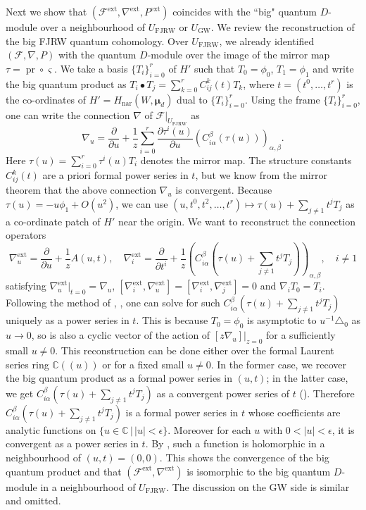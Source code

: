 \documentclass[11pt]{amsart}
\theoremstyle{definition} %
\theoremstyle{remark} %
\newcommand{\CC}{\mathbb C}
\newcommand{\nar}{\operatorname{nar}}
\def\GW{\operatorname{\text{GW}}}
\def\parfrac#1#2{\frac{\partial #1}{\partial #2}}
\newcommand{\bmu}{\boldsymbol{\mu}}
\newcommand{\cF}{\mathcal{F}}
\newcommand{\ext}{{\operatorname{ext}}}
\newcommand{\FJRW}{{\operatorname{FJRW}}}
\renewcommand{\GW}{{\operatorname{GW}}}
\newcommand{\pr}{\operatorname{pr}}
\begin{document}
Next we show that $(\cF^\ext,\nabla^\ext,P^\ext)$ coincides 
with the ``big" quantum $D$-module over a neighbourhood 
of $U_{\FJRW}$ or $U_{\GW}$. 
We review the reconstruction of the big FJRW quantum cohomology. 
Over $U_{\FJRW}$, we already identified 
$(\cF,\nabla,P)$ with the quantum $D$-module over 
the image of the mirror map $\tau = \pr \circ \varsigma$. 
We take a basis $\{T_i\}_{i=0}^r$ of $H'$ such that 
$T_0 = \phi_0$, $T_1=\phi_1$ and 
write the big quantum product as 
$T_i \bullet T_j = \sum_{k=0}^r C_{ij}^k(t) T_k$, 
where $t=(t^0,\dots,t^r)$ is the co-ordinates of 
$H'=H_{\nar}(W,\bmu_d)$ 
dual to $\{T_i\}_{i=0}^r$. 
Using the frame $\{T_i\}_{i=0}^r$, one can write 
the connection $\nabla$ of $\cF|_{U_{\FJRW}}$ as 
\[
\nabla_u = \parfrac{}{u} + \frac{1}{z} \sum_{i=0}^r \parfrac{\tau^i(u)}{u} 
\left(C_{i\alpha}^\beta(\tau(u))\right)_{\alpha,\beta}.  
\]
Here $\tau(u) = \sum_{i=0}^r \tau^i(u) T_i$ denotes the mirror map. 
The structure constants $C_{ij}^k(t)$ are a priori formal power 
series in $t$, but we know from the mirror theorem that 
the above connection $\nabla_u$ is convergent. 
Because $\tau(u) = -u\phi_1 + O(u^2)$, 
we can use $(u,t^0,t^2,\dots,t^r) 
\mapsto \tau(u) + \sum_{j\neq 1} t^j T_j$ as 
a co-ordinate patch of $H'$ near the origin. 
We want to reconstruct the connection operators 
\[
\nabla_u^\ext = 
\parfrac{}{u} + \frac{1}{z} A(u,t),\quad 
\nabla_i^\ext = \parfrac{}{t^i} + \frac{1}{z} 
\left( C_{i\alpha}^\beta
\left(\tau(u) + \textstyle 
\sum_{j\neq 1} t^j T_j\right)\right)_{\alpha,\beta}, \quad i\neq 1  
\]
satisfying $\nabla_u^\ext|_{t=0} = \nabla_u$, 
$[\nabla^\ext_i,\nabla^\ext_u] 
= [\nabla^\ext_i,\nabla^\ext_j] =0$  
and $\nabla_i T_0 = T_i$. 
Following the method of \cite[Lemma 2.9]{Hertling-Manin}, 
\cite[\S 4.4]{Iritani:genmir}, one can solve for such 
$C_{i\alpha}^\beta(\tau(u)+ \sum_{j\neq 1} t^j T_j)$ 
uniquely as a power series in $t$. 
This is because $T_0 = \phi_0$ 
is asymptotic to $u^{-1}\triangle_0$ as $u\to 0$,  
so is also a cyclic vector of the action of $[z \nabla_u]|_{z=0}$ 
for a sufficiently small $u\neq 0$. 
This reconstruction can be done either over 
the formal Laurent series ring $\CC(\!(u)\!)$ or 
for a fixed small $u\neq 0$. 
In the former case, we recover the big quantum product 
as a formal power series in $(u,t)$; 
in the latter case, we get 
$C_{i\alpha}^\beta(\tau(u)+ \sum_{j\neq 1} t^j T_j)$ 
as a convergent power series of $t$ 
(\cite[Lemma 2.9]{Hertling-Manin}). 
Therefore $C_{i\alpha}^\beta(\tau(u)+\sum_{j\neq 1}t^j T_j)$ 
is a formal power series in $t$ whose 
coefficients are analytic functions on $\{u\in \CC\,|\,|u|<\epsilon\}$. 
Moreover for each $u$ with $0<|u|<\epsilon$, it is convergent 
as a power series in $t$.  
By \cite[Lemma 6.5]{Iritani:convergence}, such a function
is holomorphic in a neighbourhood of $(u,t)=(0,0)$. 
This shows the convergence of the big quantum product 
and that $(\cF^\ext,\nabla^\ext)$ is isomorphic to  
the big quantum $D$-module in a neighbourhood of $U_{\FJRW}$. 
The discussion on the GW side 
is similar and omitted. 
\end{document}
